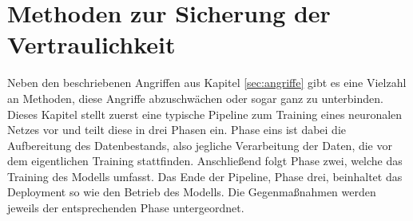 \chapter{Methoden zur Sicherung der Vertraulichkeit}\label{ch:methoden}

Neben den beschriebenen Angriffen aus Kapitel \ref{sec:angriffe} gibt es eine Vielzahl an Methoden, diese Angriffe abzuschwächen oder sogar ganz zu unterbinden.
Dieses Kapitel stellt zuerst eine typische Pipeline zum Training eines neuronalen Netzes vor und teilt diese in drei Phasen ein.
Phase eins ist dabei die Aufbereitung des Datenbestands, also jegliche Verarbeitung der Daten, die vor dem eigentlichen Training stattfinden.
Anschließend folgt Phase zwei, welche das Training des Modells umfasst.
Das Ende der Pipeline, Phase drei, beinhaltet das Deployment so wie den Betrieb des Modells.
Die Gegenmaßnahmen werden jeweils der entsprechenden Phase untergeordnet.





